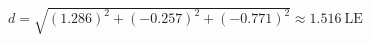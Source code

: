 \documentclass[preview]{standalone}
\begin{document}
\begin{center}
$d = \sqrt{(1.286)^2 + (-0.257)^2 + (-0.771)^2} \approx 1.516 \mathrm{\: LE}$
\end{center}
\end{document}

